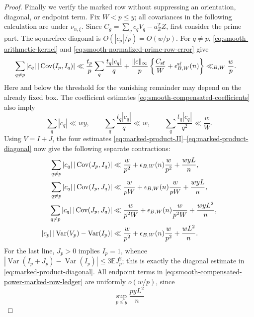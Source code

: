 \documentclass[11pt]{article}
\numberwithin{equation}{section}
\theoremstyle{definition}
\theoremstyle{remark}
\newcommand{\1}{\mathbf 1}
\begin{document}
\begin{proof}
Finally we verify the marked row without suppressing an orientation,
diagonal, or endpoint term.  Fix \(W<p\leq y\); all covariances in the
following calculation are under \(\nu_{n,\xi}\).  Since
\(C_g=\sum_qc_qV_q-a_Z^TZ\), first consider the prime part.  The
squarefree diagonal is \(O(|c_p|/p)=O(w/p)\).  For \(q\ne p\),
\eqref{eq:smooth-arithmetic-kernel} and
\eqref{eq:smooth-normalized-prime-row-error} give
\begin{align}
 \sum_{q\ne p}|c_q|\,
       |\operatorname{Cov}(I_p,I_q)|
 &\ll \frac{t_p}{p}\sum_q\frac{t_q|c_q|}{q}
   +\frac{\|c\|_\infty}{p}
       \left\{\frac{C_{\rm sf}}W+\epsilon^{\rm sf}_{B,W}(n)\right\}
 \ll_{B,W}\frac wp.
 \label{eq:smooth-compensated-squarefree-marked-row}
\end{align}
Here and below the threshold for the vanishing remainder may depend on
the already fixed box.  The coefficient estimates
\eqref{eq:smooth-compensated-coefficients} also imply
\begin{equation}
 \sum_q|c_q|\ll wy,\qquad
 \sum_q\frac{t_q|c_q|}{q}\ll w,\qquad
 \sum_q\frac{t_q|c_q|}{q^2}\ll\frac wW.
 \label{eq:smooth-compensated-marked-row-coefficient-ledger}
\end{equation}
Using \(V=I+J\), the four estimates
\eqref{eq:marked-product-JI}--\eqref{eq:marked-product-diagonal} now give
the following separate contractions:
\begin{align}
 \sum_{q\ne p}|c_q|\,|\operatorname{Cov}(J_p,I_q)|
 &\ll \frac w{p^2}+\epsilon_{B,W}(n)\frac w{p^2}
       +\frac{wyL}{n},\notag\\
 \sum_{q\ne p}|c_q|\,|\operatorname{Cov}(I_p,J_q)|
 &\ll \frac w{pW}+\epsilon_{B,W}(n)\frac w{pW}
       +\frac{wyL}{n},\notag\\
 \sum_{q\ne p}|c_q|\,|\operatorname{Cov}(J_p,J_q)|
 &\ll \frac w{p^2W}+\epsilon_{B,W}(n)\frac w{p^2W}
       +\frac{wyL^2}{n},\notag\\
 |c_p|\,|\operatorname{Var}(V_p)-\operatorname{Var}(I_p)|
 &\ll \frac w{p^2}+\epsilon_{B,W}(n)\frac w{p^2}
       +\frac{wL^2}{n}.
 \label{eq:smooth-compensated-power-marked-row-ledger}
\end{align}
For the last line, \(J_p>0\) implies \(I_p=1\), whence
\(|\operatorname{Var}(I_p+J_p)-\operatorname{Var}(I_p)|
 \leq3\mathbb E J_p^2\); this is exactly the diagonal estimate in
\eqref{eq:marked-product-diagonal}.  All endpoint terms in
\eqref{eq:smooth-compensated-power-marked-row-ledger} are uniformly
\(o(w/p)\), since
\begin{equation}
 \sup_{p\leq y}\frac{pyL^2}{n}

\end{equation}
\end{proof}
\end{document}
